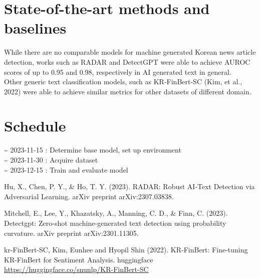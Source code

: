 \documentclass{article}
\begin{document}
\section{State-of-the-art methods and baselines}
While there are no comparable models for machine generated Korean news article detection, works such as RADAR and DetectGPT were able to achieve AUROC scores of up to 0.95 and 0.98, respectively in AI generated text in general.\\
Other generic text classification models, such as KR-FinBert-SC (Kim, et al., 2022) were able to achieve similar metrics for other datasets of different domain.

\section{Schedule}
\textasciitilde{} 2023-11-15 : Determine base model, set up environment\\
\textasciitilde{} 2023-11-30 : Acquire dataset\\
\textasciitilde{} 2023-12-15 : Train and evaluate model



Hu, X., Chen, P. Y., \& Ho, T. Y. (2023). RADAR: Robust AI-Text Detection via Adversarial Learning. arXiv preprint arXiv:2307.03838.

Mitchell, E., Lee, Y., Khazatsky, A., Manning, C. D., \& Finn, C. (2023). Detectgpt: Zero-shot machine-generated text detection using probability curvature. arXiv preprint arXiv:2301.11305.

kr-FinBert-SC, Kim, Eunhee and Hyopil Shin (2022). KR-FinBert: Fine-tuning KR-FinBert for Sentiment Analysis. huggingface \url{https://huggingface.co/snunlp/KR-FinBert-SC}
\end{document}
